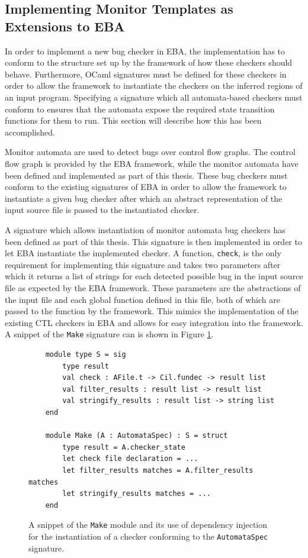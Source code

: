 \subsection{Implementing Monitor Templates as Extensions to EBA}
\label{integration-into-eba}

\noindent In order to implement a new bug checker in EBA, the implementation has to conform to the structure set up by the framework of how these checkers should behave. Furthermore, OCaml signatures must be defined for these checkers in order to allow the framework to instantiate the checkers on the inferred regions of an input program. Specifying a signature which all automata-based checkers must conform to ensures that the automata expose the required state transition functions for them to run. This section will describe how this has been accomplished.  

\newpar Monitor automata are used to detect bugs over control flow graphs. The control flow graph is provided by the EBA framework, while the monitor automata have been defined and implemented as part of this thesis. These bug checkers must conform to the existing signatures of EBA in order to allow the framework to instantiate a given bug checker after which an abstract representation of the input source file is passed to the instantiated checker. 

\newpar A signature which allows instantiation of monitor automata bug checkers has been defined as part of this thesis. This signature is then implemented in order to let EBA instantiate the implemented checker. A function, \texttt{check}, is the only requirement for implementing this signature and takes two parameters after which it returns a list of strings for each detected possible bug in the input source file as expected by the EBA framework. These parameters are the abstractions of the input file and each global function defined in this file, both of which are passed to the function by the framework. This mimics the implementation of the existing CTL checkers in EBA and allows for easy integration into the framework. A snippet of the \texttt{Make} signature can is shown in Figure \ref{make-signature}.

\begin{figure}[H]
    \centering
    \begin{verbatim}
    module type S = sig
        type result
        val check : AFile.t -> Cil.fundec -> result list
        val filter_results : result list -> result list
        val stringify_results : result list -> string list
    end

    module Make (A : AutomataSpec) : S = struct
        type result = A.checker_state
        let check file declaration = ...
        let filter_results matches = A.filter_results matches
        let stringify_results matches = ...
    end
    \end{verbatim}
    \caption{A snippet of the \texttt{Make} module and its use of dependency injection for the instantiation of a checker conforming to the \texttt{AutomataSpec} signature.}
    \label{make-signature}
\end{figure}

